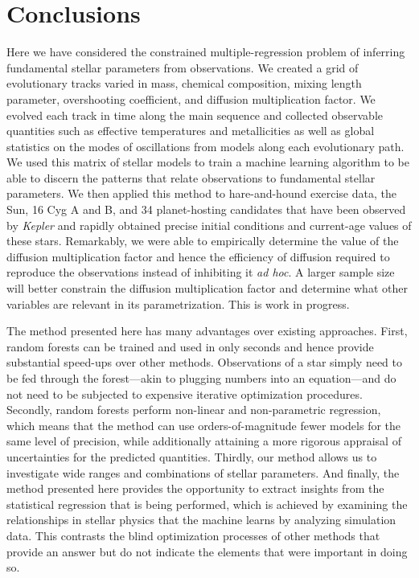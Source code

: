 \documentclass[manuscript,linenumbers]{aastex6}
\newif\ifref
\newcommand{\mb}[1]{\ifref\boldmath\textbf{#1}\unboldmath\else #1\fi}
\begin{document}
\section{Conclusions}
Here we have considered the constrained multiple-regression problem of inferring fundamental stellar parameters from observations. We created a grid of evolutionary tracks varied in mass, chemical composition, mixing length parameter, overshooting coefficient, and diffusion \mb{multiplication} factor. We evolved each track in time along the main sequence and collected \mb{observable quantities} such as effective temperatures and metallicities as well as global statistics on the modes of oscillations from models along each evolutionary path. We used this matrix of \mb{stellar models} to train a machine learning algorithm to be able to discern the patterns that relate observations to \mb{fundamental stellar parameters}. We then applied this method to hare-and-hound exercise data, the Sun, 16 Cyg A and B, and 34 planet-hosting candidates that have been observed by \emph{Kepler} and rapidly obtained precise initial conditions and current-age values of these stars. %
Remarkably, we were able to empirically determine the value of the diffusion \mb{multiplication} factor and hence the efficiency of diffusion required to reproduce the observations instead of inhibiting it \emph{ad hoc}. A larger sample size \mb{will} better constrain the diffusion \mb{multiplication} factor and determine what other variables are relevant in its parametrization. \mb{This is work in progress.}

The method presented here has many advantages over existing approaches. First, random forests can be trained and used in only seconds and hence provide substantial speed-ups over other methods. Observations of a star simply need to be fed through the forest---akin to plugging numbers into an equation---and do not need to be subjected to expensive iterative optimization procedures. 
Secondly, random forests perform non-linear and non-parametric regression, which means that the method can use orders-of-magnitude fewer models for the same level of precision, while additionally attaining a more rigorous appraisal of uncertainties for the predicted quantities. 
Thirdly, our method allows us to investigate wide ranges and combinations of stellar parameters. 
And finally, the method presented here provides the opportunity to extract insights from the statistical regression that is being performed, which is achieved by examining the relationships in stellar physics that the machine learns by analyzing simulation data. This contrasts the blind optimization processes of other methods that provide an answer but do not indicate the elements that were important in doing so. 
\end{document}

